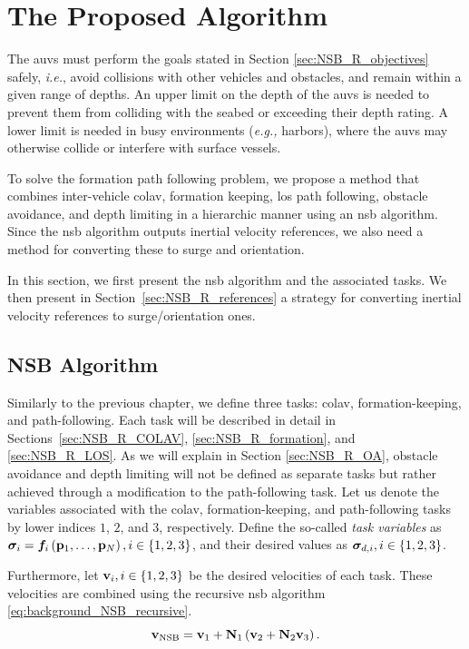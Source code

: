 \section{The Proposed Algorithm}
\label{sec:NSB_R_control}

The \glspl{auv} must perform the goals stated in Section \ref{sec:NSB_R_objectives} safely, \emph{i.e.},
avoid collisions with other vehicles and obstacles, and remain within a given range of depths.
An upper limit on the depth of the \glspl{auv} is needed to prevent them from colliding with the seabed or exceeding their depth rating.
A lower limit is needed in busy environments (\emph{e.g.,} harbors), where the \glspl{auv} may otherwise collide or interfere with surface vessels.

To solve the formation path following problem, we propose a method that combines inter-vehicle \acrfull{colav}, formation keeping, \acrfull{los} path following, obstacle avoidance, and depth limiting in a hierarchic manner using an \gls{nsb} algorithm.
Since the \gls{nsb} algorithm outputs inertial velocity references, we also need a method for converting these to surge and orientation.

In this section, we first present the \gls{nsb} algorithm and the associated tasks.
We then present in Section~\ref{sec:NSB_R_references} a strategy for converting inertial velocity references to surge/orientation ones.

\subsection{NSB Algorithm}
\label{sec:NSB_R_NSB}

Similarly to the previous chapter, we define three tasks: \gls{colav}, formation-keeping, and path-following.
Each task will be described in detail in Sections~\ref{sec:NSB_R_COLAV}, \ref{sec:NSB_R_formation}, and \ref{sec:NSB_R_LOS}.
As we will explain in Section \ref{sec:NSB_R_OA}, obstacle avoidance and depth limiting will not be defined as separate tasks but rather achieved through a modification to the path-following task.
Let us denote the variables associated with the \gls{colav}, formation-keeping, and path-following tasks by lower indices $1$, $2$, and $3$, respectively.
Define the so-called \emph{task variables} as $\bm{\sigma}_i = \bm{f}_i\left(\mathbf{p}_1, \ldots, \mathbf{p}_N\right), i \in \left\{1,2,3\right\}$, and their desired values as $\bm{\sigma}_{d,i}, i \in \left\{1,2,3\right\}$.

Furthermore, let $\mathbf{v}_i, i \in \left\{1,2,3\right\}$ be the desired velocities of each task.    
These velocities are combined using the recursive \gls{nsb} algorithm \eqref{eq:background_NSB_recursive}.
\begin{equation} 
    \mathbf{v}_{\rm NSB} = \mathbf{v}_1 + \mathbf{N}_1\left(\mathbf{v}_2 + \mathbf{N}_2\mathbf{v}_3\right). \label{eq:NSB_R_NSB_with_COLAV}
\end{equation}

